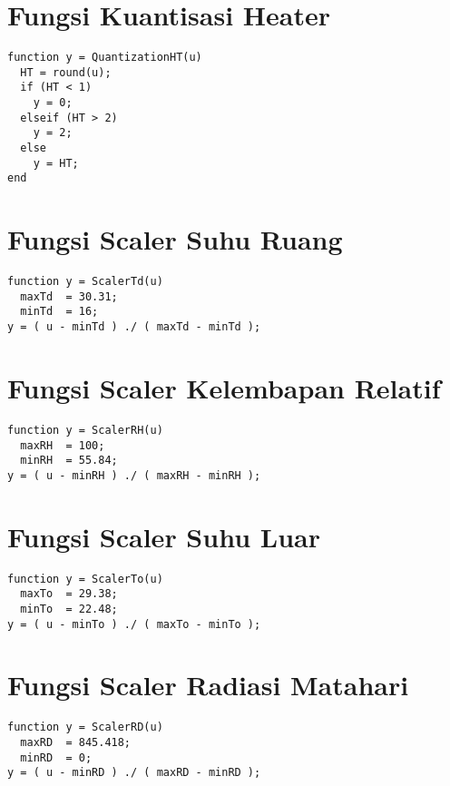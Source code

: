 \section{Fungsi Kuantisasi Heater}
\begin{lstlisting}
function y = QuantizationHT(u)
  HT = round(u);
  if (HT < 1)
    y = 0;
  elseif (HT > 2)
    y = 2;
  else
    y = HT;
end
\end{lstlisting}
\hfill

\section{Fungsi Scaler Suhu Ruang}
\begin{lstlisting}
function y = ScalerTd(u)
  maxTd  = 30.31;
  minTd  = 16;
y = ( u - minTd ) ./ ( maxTd - minTd );
\end{lstlisting}
\hfill

\section{Fungsi Scaler Kelembapan Relatif}
\begin{lstlisting}
function y = ScalerRH(u)
  maxRH  = 100;
  minRH  = 55.84;
y = ( u - minRH ) ./ ( maxRH - minRH );
\end{lstlisting}
\hfill

\section{Fungsi Scaler Suhu Luar}
\begin{lstlisting}
function y = ScalerTo(u)
  maxTo  = 29.38;
  minTo  = 22.48;
y = ( u - minTo ) ./ ( maxTo - minTo );
\end{lstlisting}
\hfill

\section{Fungsi Scaler Radiasi Matahari}
\begin{lstlisting}
function y = ScalerRD(u)
  maxRD  = 845.418;
  minRD  = 0;
y = ( u - minRD ) ./ ( maxRD - minRD );
\end{lstlisting}
\hfill
